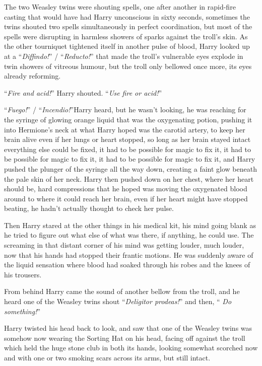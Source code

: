 The two Weasley twins were shouting spells, one after another in rapid-fire casting that would have had Harry unconscious in sixty seconds, sometimes the twins shouted two spells simultaneously in perfect coordination, but most of the spells were disrupting in harmless showers of sparks against the troll’s skin. As the other tourniquet tightened itself in another pulse of blood, Harry looked up at a “\emph{Diffindo!}” / “\emph{Reducto!}” that made the troll’s vulnerable eyes explode in twin showers of vitreous humour, but the troll only bellowed once more, its eyes already reforming.

“\emph{Fire and acid!}” Harry shouted. “\emph{Use fire or acid!}”

“\emph{Fuego!}” / “\emph{Incendio!}”Harry heard, but he wasn’t looking, he was reaching for the syringe of glowing orange liquid that was the oxygenating potion, pushing it into Hermione’s neck at what Harry hoped was the carotid artery, to keep her brain alive even if her lungs or heart stopped, so long as her brain stayed intact everything else could be fixed, it had to be possible for magic to fix it, it had to be possible for magic to fix it, it had to be possible for magic to fix it, and Harry pushed the plunger of the syringe all the way down, creating a faint glow beneath the pale skin of her neck. Harry then pushed down on her chest, where her heart should be, hard compressions that he hoped was moving the oxygenated blood around to where it could reach her brain, even if her heart might have stopped beating, he hadn’t actually thought to check her pulse.

Then Harry stared at the other things in his medical kit, his mind going blank as he tried to figure out what else of what was there, if anything, he could use. The screaming in that distant corner of his mind was getting louder, much louder, now that his hands had stopped their frantic motions. He was suddenly aware of the liquid sensation where blood had soaked through his robes and the knees of his trousers.

From behind Harry came the sound of another bellow from the troll, and he heard one of the Weasley twins shout “\emph{Deligitor prodeas!}” and then, “\emph{ Do something!}”

Harry twisted his head back to look, and saw that one of the Weasley twins was somehow now wearing the Sorting Hat on his head, facing off against the troll which held the huge stone club in both its hands, looking somewhat scorched now and with one or two smoking scars across its arms, but still intact.

